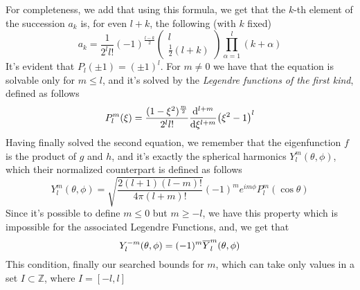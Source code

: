 \documentclass[../qm.tex]{subfiles}
\begin{document}
	For completeness, we add that using this formula, we get that the $k$-th element of the succession $a_k$ is, for even $l+k$, the following (with $k$ fixed)
	\begin{equation*}
		a_k=\frac{1}{2^ll!}(-1)^{\frac{l-k}{2}}\begin{pmatrix}l\\\frac{1}{2}(l+k)\end{pmatrix}\prod_{\alpha=1}^l(k+\alpha)
	\end{equation*}
	It's evident that $P_l(\pm1)=(\pm1)^l$. For $m\ne0$ we have that the equation is solvable only for $m\le l$, and it's solved by the \textit{Legendre functions of the first kind}, defined as follows
	\begin{equation}
		P_l^m(\xi)=\frac{(1-\xi^2)^{\frac{m}{2}}}{2^ll!}\derivative[l+m]{\xi}(\xi^2-1)^l
		\label{eq:generallegendre}
	\end{equation}
	Having finally solved the second equation, we remember that the eigenfunction $f$ is the product of $g$ and $h$, and it's exactly the spherical harmonics $Y^m_l(\theta,\phi)$, which their normalized counterpart is defined as follows
	\begin{equation}
		Y^m_l(\theta,\phi)=\sqrt{\frac{2(l+1)(l-m)!}{4\pi(l+m)!}}(-1)^me^{im\phi}P^m_l(\cos\theta)
		\label{eq:sphharmcomp}
	\end{equation}
	Since it's possible to define $m\le0$ but $m\ge-l$, we have this property which is impossible for the associated Legendre Functions, and, we get that
	\begin{equation}
		Y^{-m}_l(\theta,\phi)=(-1)^m\overline{Y}^m_l(\theta,\phi)
		\label{eq:minusmsphharm}
	\end{equation}
	This condition, finally our searched bounds for $m$, which can take only values in a set $I\subset\mathbb{Z}$, where $I=[-l,l]$
\end{document}
